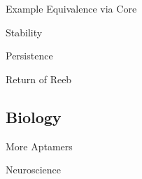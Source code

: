\documentclass{beamer}
\begin{document}
\begin{frame}{Example Equivalence via Core}
\begin{figure}
\begin{center}
    \end{center}
  \end{figure}
\end{frame}

\begin{frame}{Stability}
  
\end{frame}

\begin{frame}{Persistence}
  
\end{frame}

\begin{frame}{Return of Reeb}
  
\end{frame}

\subsection{Biology}
\begin{frame}{More Aptamers}
  
\end{frame}

\begin{frame}{Neuroscience}

\end{frame}

\begin{frame}
  \printbibliography
\end{frame}
\end{document}
